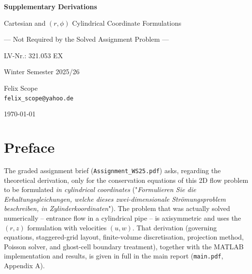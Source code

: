 \documentclass[12pt,a4paper]{article}
\begin{document}
\begin{titlepage}
    \centering
    \vspace*{2cm}

    {\Huge\bfseries Supplementary Derivations\par}

    \vspace{1cm}

    {\Large Cartesian and $(r,\phi)$ Cylindrical Coordinate Formulations\par}
    {\large --- Not Required by the Solved Assignment Problem ---\par}

    \vspace{1cm}

    {\large LV-Nr.: 321.053 EX\par}
    {\large Winter Semester 2025/26\par}

    \vfill

    {\Large
    Felix Scope\\
    \texttt{felix\_scope@yahoo.de}\\
    }

    \vfill

    {\large \today\par}
\end{titlepage}

\tableofcontents
\newpage

\section*{Preface}

The graded assignment brief (\texttt{Assignment\_WS25.pdf}) asks, regarding
the theoretical derivation, only for the conservation equations of this 2D
flow problem to be formulated \emph{in cylindrical coordinates}
("\emph{Formulieren Sie die Erhaltungsgleichungen, welche dieses
zwei-dimensionale Str\"omungsproblem beschreiben, in Zylinderkoordinaten}").
The problem that was actually solved numerically -- entrance flow in a
cylindrical pipe -- is axisymmetric and uses the $(r,z)$ formulation with
velocities $(u,w)$. That derivation (governing equations, staggered-grid
layout, finite-volume discretisation, projection method, Poisson solver, and
ghost-cell boundary treatment), together with the MATLAB implementation and
results, is given in full in the main report (\texttt{main.pdf}, Appendix A).
\end{document}
